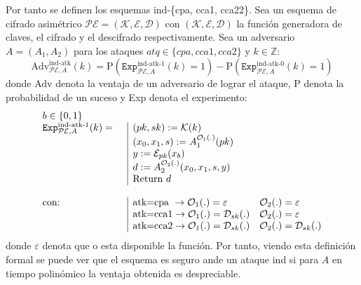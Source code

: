 Por tanto se definen los esquemas \acrshort{ind}-\{\acrshort{cpa}, \acrshort{cca1}, \acrshort{cca22}\}. Sea un esquema de cifrado asimétrico \(\mathcal{PE}=(\mathcal{K},\mathcal{E},\mathcal{D})\) con \((\mathcal{K},\mathcal{E},\mathcal{D})\) la función generadora de claves, el cifrado y el descifrado respectivamente. Sea un adversario \(A=(A_1,A_2)\) para los ataques \(atq\in \{cpa, cca1, cca2\}\) y \(k\in\mathbb{Z}\):
\begin{equation}
	\text{Adv}_{\mathcal{PE},A}^{\text{ind-atk}}(k)=\text{P}\left(\texttt{Exp}_{\mathcal{PE},A}^{\text{ind-atk-1}}(k)=1\right)-\text{P}\left(\texttt{Exp}_{\mathcal{PE},A}^{\text{ind-atk-0}}(k)=1\right)
\end{equation}
donde Adv denota la ventaja de un adversario de lograr el ataque, P denota la probabilidad de un suceso y Exp denota el experimento:
\begin{equation}
	\begin{array}{llll}
		b\in\{0,1\}&\\
		\texttt{Exp}_{\mathcal{PE},A}^{\text{ind-atk-1}}(k)=&\kern\arraycolsep\vline\kern-\arraycolsep\hfilneg&(pk,sk):=\mathcal{K}(k)\\
		&\kern\arraycolsep\vline\kern-\arraycolsep\hfilneg&(x_0,x_1,s):=A_1^{\mathcal{O}_1(.)}(pk)\\
		&\kern\arraycolsep\vline\kern-\arraycolsep\hfilneg&y:=\mathcal{E}_{pk}(x_b)\\
		&\kern\arraycolsep\vline\kern-\arraycolsep\hfilneg&d:=A_2^{\mathcal{O}_2(.)}(x_0,x_1,s,y)\\
		&\kern\arraycolsep\vline\kern-\arraycolsep\hfilneg&\text{Return } d\\
		\\
		\text{con:}& \kern\arraycolsep\vline\kern-\arraycolsep\hfilneg& \text{atk=cpa }\rightarrow \mathcal{O}_1(.)=\varepsilon & \mathcal{O}_2(.)=\varepsilon\\
		& \kern\arraycolsep\vline\kern-\arraycolsep\hfilneg& \text{atk=cca1}\rightarrow \mathcal{O}_1(.)=\mathcal{D}_{sk}(.) & \mathcal{O}_2(.)=\varepsilon\\
		& \kern\arraycolsep\vline\kern-\arraycolsep\hfilneg& \text{atk=cca2}\rightarrow \mathcal{O}_1(.)=\mathcal{D}_{sk}(.) & \mathcal{O}_2(.)=\mathcal{D}_{sk}(.)\\
	\end{array}
\end{equation}
donde $\varepsilon$ denota que o esta disponible la función. Por tanto, viendo esta definición formal se puede ver que el esquema es seguro ande un ataque \acrshort{ind} si para \(A\) en tiempo polinómico la ventaja obtenida es despreciable.
\newline

